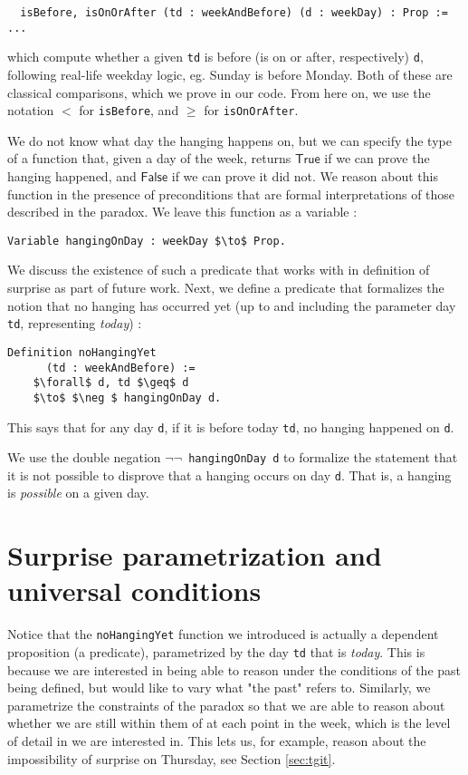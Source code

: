 \documentclass[journal]{journal}
\begin{document}
\begin{lstlisting}
  isBefore, isOnOrAfter (td : weekAndBefore) (d : weekDay) : Prop := ...
\end{lstlisting}

which compute whether a given {\tt td} is before (is on or after, respectively) {\tt d},
following real-life weekday logic, eg. Sunday is before Monday.
Both of these are classical comparisons, which we prove in our code.
From here on, we use the notation $<$ for {\tt isBefore}, and
$\geq$ for {\tt isOnOrAfter}.

We do not know what day the hanging happens on, but we can specify the type of a
function that, given a day of the week, returns $\mathsf{True}$ if we can prove the hanging
happened, and $\mathsf{False}$ if we can prove it did not. We reason about this function
in the presence of preconditions that are formal interpretations of those described
in the paradox. We leave this function as a variable :

\begin{lstlisting}[mathescape=true]
  Variable hangingOnDay : weekDay $\to$ Prop.
\end{lstlisting}

We discuss the existence of such a predicate that
works with in definition of surprise as part of future work.
Next, we define a predicate that formalizes the notion that no hanging has occurred
yet (up to and including the parameter day {\tt td}, representing \emph{today}) :

\begin{lstlisting}[mathescape=true]
  Definition noHangingYet
      (td : weekAndBefore) :=
    $\forall$ d, td $\geq$ d
    $\to$ $\neg $ hangingOnDay d.
\end{lstlisting}

This says that for any day {\tt d}, if it is before today {\tt td}, no hanging
happened on {\tt d}.

We use the double negation {\tt $\neg \neg$ hangingOnDay d} to formalize the statement that it is
not possible to disprove that a hanging occurs on day {\tt d}. That is, a hanging
is \emph{possible} on a given day.

\section{Surprise parametrization and universal conditions}
\label{sec:universal}

Notice that the {\tt noHangingYet} function we introduced is actually a
dependent proposition (a predicate), parametrized by
the day {\tt td} that is \emph{today}. This is because we are interested in
being able to reason under the conditions of the past being defined, but
would like to vary what "the past" refers to. Similarly, we parametrize the
constraints of the paradox so that we are able to reason about
whether we are still within them of at each point in the week,
which is the level of detail in we are interested in. This lets us, for example,
reason about the impossibility of surprise on Thursday, see Section \ref{sec:tgit}.
\end{document}
